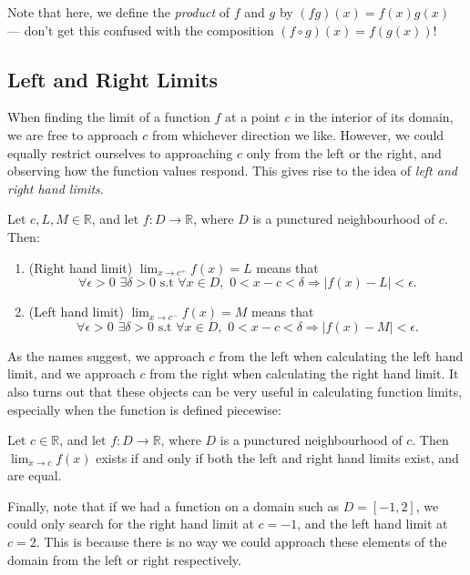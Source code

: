 \documentclass[
  17pt,
  a4paper]{extarticle}
\providecommand{\tightlist}{%
  \setlength{\itemsep}{0pt}\setlength{\parskip}{0pt}}
\theoremstyle{plain}
\theoremstyle{definition}
\theoremstyle{plain}
\theoremstyle{plain}
\theoremstyle{plain}
\theoremstyle{plain}
\theoremstyle{definition}
\theoremstyle{definition}
\theoremstyle{remark}
\theoremstyle{remark}
\let\BeginKnitrBlock\begin \let\EndKnitrBlock\end
\renewcommand{\;}{\,}
\begin{document}
Note that here, we define the \emph{product} of \(f\) and \(g\) by \((fg)(x) = f(x)g(x)\) --- don't get this confused with the composition \((f \circ g)(x) = f(g(x))\)!

\hypertarget{left-and-right-limits}{%
\subsection{Left and Right Limits}\label{left-and-right-limits}}

When finding the limit of a function \(f\) at a point \(c\) in the interior of its domain, we are free to approach \(c\) from whichever direction we like. However, we could equally restrict ourselves to approaching \(c\) only from the left or the right, and observing how the function values respond. This gives rise to the idea of \emph{left and right hand limits}.

\BeginKnitrBlock{definition}[Left and Right Hand Limits]
{\label{def:def1} }Let \(c, L, M \in \mathbb{R}\), and let \(f: D \to \mathbb{R}\), where \(D\) is a punctured neighbourhood of \(c\). Then:

\begin{enumerate}
\def\labelenumi{\arabic{enumi}.}
\tightlist
\item
  (Right hand limit) \(\lim_{x \to c^{+}}f(x) = L\) means that \[\forall \epsilon >0\;\;\exists \delta>0\;\;\text{s.t}\;\; \forall x \in D,\;\; 0 < x - c < \delta \Rightarrow \lvert f(x) - L \rvert < \epsilon.\]
\item
  (Left hand limit) \(\lim_{x \to c^{-}}f(x) = M\) means that \[\forall \epsilon >0\;\;\exists \delta>0\;\;\text{s.t}\;\; \forall x \in D,\;\; 0 < x - c < \delta \Rightarrow \lvert f(x) - M \rvert < \epsilon.\]
\end{enumerate}
\EndKnitrBlock{definition}

As the names suggest, we approach \(c\) from the left when calculating the left hand limit, and we approach \(c\) from the right when calculating the right hand limit. It also turns out that these objects can be very useful in calculating function limits, especially when the function is defined piecewise:

\BeginKnitrBlock{proposition}
{\label{prp:prop1} }Let \(c \in \mathbb{R}\), and let \(f: D \to \mathbb{R}\), where \(D\) is a punctured neighbourhood of \(c\). Then \(\lim_{x \to c}f(x)\) exists if and only if both the left and right hand limits exist, and are equal.
\EndKnitrBlock{proposition}

Finally, note that if we had a function on a domain such as \(D = [-1,2]\), we could only search for the right hand limit at \(c = -1\), and the left hand limit at \(c = 2\). This is because there is no way we could approach these elements of the domain from the left or right respectively.
\end{document}

